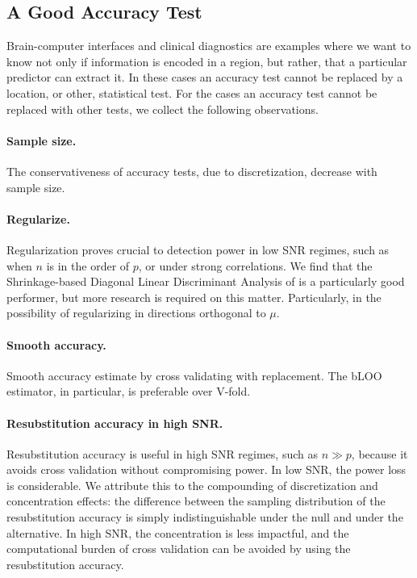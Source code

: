 \documentclass[12pt,a4paper]{article}
\begin{document}
\subsection{A Good Accuracy Test}
Brain-computer interfaces and clinical diagnostics \citep[e.g.][]{olivetti_induction_2012,wager_fmri-based_2013} are examples where we want to know not only if information is encoded in a region, but rather, that a particular predictor can extract it. 
In these cases an accuracy test cannot be replaced by a location, or other, statistical test. 
For the cases an accuracy test cannot be replaced with other tests, we collect the following observations.

\paragraph{Sample size.} The conservativeness of accuracy tests, due to discretization, decrease with sample size. 

\paragraph{Regularize.}
Regularization proves crucial to detection power in low SNR regimes, such as when $n$ is in the order of $p$, or under strong correlations.
We find that the Shrinkage-based Diagonal Linear Discriminant Analysis of \cite{pang_shrinkage-based_2009} is a particularly good performer, but more research is required on this matter. 
Particularly, in the possibility of regularizing in directions orthogonal to $\mu$. 


\paragraph{Smooth accuracy.}
Smooth accuracy estimate by cross validating with replacement. 
The bLOO estimator, in particular, is preferable over V-fold.


\paragraph{Resubstitution accuracy in high SNR.} 
Resubstitution accuracy is useful in high SNR regimes, such as $n \gg p$, because it avoids cross validation without compromising power. 
In low SNR, the power loss is considerable. 
We attribute this to the compounding of discretization and concentration effects: the difference between the sampling distribution of the resubstitution accuracy is simply indistinguishable under the null and under the alternative. 
In high SNR, the concentration is less impactful, and the computational burden of cross validation can be avoided by using the resubstitution accuracy. \newline
\end{document}
